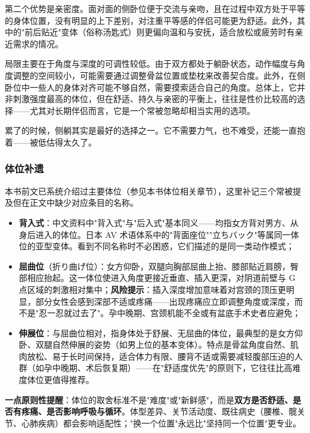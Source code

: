 \documentclass[12pt,UTF8]{ctexbook}
\begin{document}
第二个优势是亲密度。面对面的侧卧位便于交流与亲吻，且在过程中双方处于平等的身体位置，没有明显的上下差别，对注重平等感的伴侣可能更为舒适。此外，其中的"前后贴近"变体（俗称汤匙式）则更偏向温和与安抚，适合放松或疲劳时有亲近需求的情况。

局限主要在于角度与深度的可调性较低。由于双方都处于躺卧状态，动作幅度与角度调整的空间较小，可能需要通过调整骨盆位置或垫枕来改善契合度。此外，在侧卧位中一些人的身体对齐可能不够自然，需要摸索适合自己的角度。总体上，它并非刺激强度最高的体位，但在舒适、持久与亲密的平衡上，往往是性价比较高的选择——尤其对长期伴侣而言，它是一个常被忽略却相当实用的选项。

\begin{tcolorbox}[colback=pink!5!white,colframe=red!50!black,title=贴心小叮咛]
累了的时候，侧躺其实是最好的选择之一。它不需要力气，也不难受，还能一直抱着——被低估得太久了。
\end{tcolorbox}

\vspace{0.5em}
\subsubsection{体位补遗}

本书前文已系统介绍过主要体位（参见本书体位相关章节），这里补记三个常被提及但在正文中缺少对应条目的名称。

\begin{itemize}
\item \textbf{背入式}：中文资料中"背入式"与"后入式"基本同义——均指女方背对男方、从身后进入的体位。日本 AV 术语体系中的"背面座位""立ちバック"等属同一体位的亚型变体。看到不同名称时不必困惑，它们描述的是同一类动作模式；
\item \textbf{屈曲位}（折り曲げ位）：女方仰卧，双腿向胸部屈曲上抬、膝部贴近肩膀，臀部相应抬起。这一体位使进入角度更接近垂直、插入更深，对阴道前壁与 G 点区域的刺激相对集中；\textbf{风险提示}：插入深度增加意味着对宫颈的顶压更明显，部分女性会感到深部不适或疼痛——出现疼痛应立即调整角度或深度，而不是"忍一忍就过去了"。孕中晚期、宫颈机能不全或有盆底手术史者应避免；
\item \textbf{伸展位}：与屈曲位相对，指身体处于舒展、无屈曲的体位，最典型的是女方仰卧、双腿自然伸展的姿势（如男上位的基本变体）。特点是骨盆角度自然、肌肉放松、易于长时间保持，适合体力有限、腰背不适或需要减轻腹部压迫的人群（如孕中晚期、术后恢复期）——在"舒适度优先"的原则下，它往往比高难度体位更值得推荐。
\end{itemize}

\noindent\textbf{一点原则性提醒}：体位的取舍标准不是"难度"或"新鲜感"，而是\textbf{双方是否舒适、是否有疼痛、是否影响呼吸与循环}。体型差异、关节活动度、既往病史（腰椎、髋关节、心肺疾病）都会影响适配性；"换一个位置"永远比"坚持同一个位置"更专业。
\end{document}
